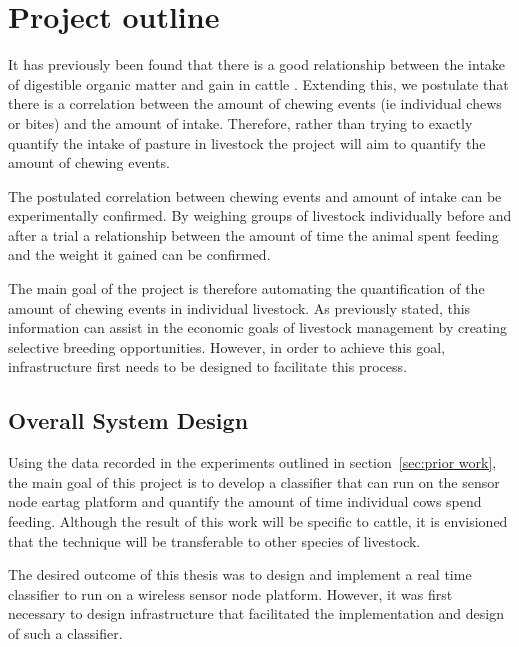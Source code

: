 \chapter{Project outline}
It has previously been found that there is a good relationship between the intake of digestible organic matter and gain in cattle \cite{Lippke1980}. Extending this, we postulate that there is a correlation between the amount of chewing events (ie individual chews or bites) and the amount of intake. Therefore, rather than trying to exactly quantify the intake of pasture in livestock the project will aim to quantify the amount of chewing events. 

The postulated correlation between chewing events and amount of intake can be experimentally confirmed. By weighing groups of livestock individually before and after a trial a relationship between the amount of time the animal spent feeding and the weight it gained can be confirmed. 

The main goal of the project is therefore automating the quantification of the amount of chewing events in individual livestock. As previously stated, this information can assist in the economic goals of livestock management by creating selective breeding opportunities. However, in order to achieve this goal, infrastructure first needs to be designed to facilitate this process. 


\section{Overall System Design}

Using the data recorded in the experiments outlined in section~\ref{sec:prior work}, the main goal of this project is to develop a classifier that can run on the sensor node eartag platform and quantify the amount of time individual cows spend feeding. Although the result of this work will be specific to cattle, it is envisioned that the technique will be transferable to other species of livestock. 

The desired outcome of this thesis was to design and implement a real time classifier to run on a wireless sensor node platform. However, it was first necessary to design infrastructure that facilitated the implementation and design of such a classifier. 

